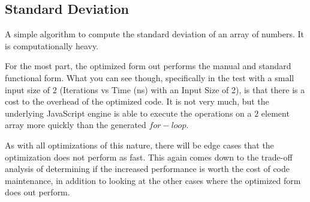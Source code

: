 \subsection{Standard Deviation}
A simple algorithm to compute the standard deviation of an array of numbers. It is computationally heavy.

For the most part, the optimized form out performs the manual and standard functional form.  What you can see though, specifically in the test with a small input size of $2$ (Iterations vs Time (ns) with an Input Size of 2), is that there is a cost to the overhead of the optimized code.  It is not very much, but the underlying JavaScript engine is able to execute the operations on a $2$ element array more quickly than the generated $for-loop$.  

As with all optimizations of this nature, there will be edge cases that the optimization does not perform as fast.  This again comes down to the trade-off analysis of determining if the increased performance is worth the cost of code maintenance, in addition to looking at the other cases where the optimized form does out perform.